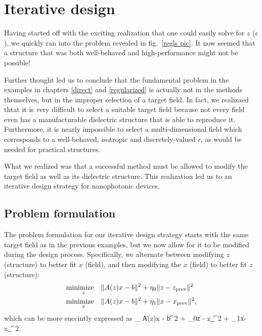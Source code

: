 \chapter{Iterative design} \label{iterative}
Having started off with the exciting realization that one could easily 
    solve for $z$ ($\epsilon$), we quickly ran into 
    the problem revealed in fig.~\ref{regls pic}.
It now seemed that a structure that was both well-behaved and high-performance
    might not be possible!

Further thought led us to conclude that
    the fundamental problem in the examples 
    in chapters \ref{direct} and \ref{regularized}
    is actually not in the methods themselves, 
    but in the improper selection of a target field. 
In fact, we realizaed thtat it is very difficult to select a suitable target field 
    because not every field even has a manufacturable dielectric structure 
    that is able to reproduce it. 
Furthermore, it is nearly impossible to select a multi-dimensional field 
    which corresponds to a well-behaved, isotropic and 
    discretely-valued $\epsilon$, 
    as would be needed for practical structures. 

What we realized was that a successful method 
    must be allowed to modify the target field as well as 
    its dielectric structure.
This realization led us to an iterative design strategy for nanophotonic devices.

\section{Problem formulation}
The problem formulation for our iterative design strategy
    starts with the same target field as in the previous examples,
    but we now allow for it to be modified during the design process. 
Specifically, we alternate between modifying $z$ (structure) 
    to better fit $x$ (field), 
    and then modifying the $x$ (field) to better fit $z$ (structure):
    \begin{subequations}\begin{align} 
    \operatorname*{\text{minimize}\quad}_z & \|A(z)x - b\|^2 + \eta_0\|z - z_\text{prev}\|^2 \\
    \operatorname*{\text{minimize}\quad}_x & \|A(z)x - b\|^2 + \eta_1\|x - x_\text{prev}\|^2,
    \end{align}\end{subequations}
which can be more succintly expressed as 
    \BE \minimize_ 
        \|A(z)x - b\|^2 + \eta_0\|z - z_\|^2
                        + \eta_1\|x-x_\|^2. \label{iterative problem}\EE

